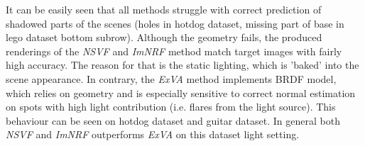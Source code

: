 It can be easily seen that all methods struggle
with correct prediction of shadowed parts of the scenes
(holes in hotdog dataset, missing part of base in lego dataset bottom subrow).
Although the geometry fails, the produced renderings
of the \textit{NSVF} and \textit{ImNRF} method match target images with fairly high accuracy.
The reason for that is the static lighting, which is 'baked' into the scene appearance.
In contrary, the \textit{ExVA} method implements BRDF model,
which relies on geometry and is especially sensitive to correct normal estimation
on spots with high light contribution (i.e. flares from the light source).
This behaviour can be seen on hotdog dataset and guitar dataset.
In general both \textit{NSVF} and \textit{ImNRF} outperforms \textit{ExVA} on this dataset light setting.
















